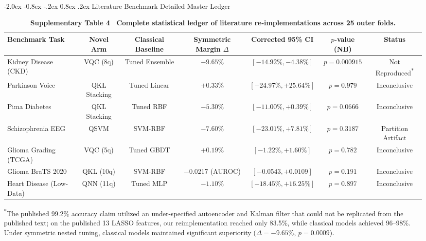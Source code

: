 \documentclass[10pt,a4paper]{article}
\makeatletter
\renewcommand{\subsection}{\@startsection{subsection}{2}{\z@}%
  {-2.0ex \@plus -0.8ex \@minus -.2ex}%
  {0.8ex \@plus.2ex}%
  {\normalfont\large\sffamily\bfseries\color{naturedark}}}
\makeatother
\begin{document}
\subsection{Literature Benchmark Detailed Master Ledger}
\begin{table}[h]
\centering
\scriptsize
\caption*{\textbf{\textsf{Supplementary Table 4 \textbar\ Complete statistical ledger of literature re-implementations across 25 outer folds.}}}
\begin{tabular}{lcccccc}
\toprule
\textbf{Benchmark Task} & \textbf{Novel Arm} & \textbf{Classical Baseline} & \textbf{Symmetric Margin $\Delta$} & \textbf{Corrected 95\% CI} & \textbf{$p$-value (NB)} & \textbf{Status} \\
\midrule
Kidney Disease (CKD) & VQC (8q) & Tuned Ensemble & $-9.65\%$ & $[-14.92\%, -4.38\%]$ & $p = 0.000915$ & Not Reproduced\textsuperscript{*} \\
Parkinson Voice & QKL Stacking & Tuned Linear & $+0.33\%$ & $[-24.97\%, +25.64\%]$ & $p = 0.979$ & Inconclusive \\
Pima Diabetes & QKL Stacking & Tuned RBF & $-5.30\%$ & $[-11.00\%, +0.39\%]$ & $p = 0.0666$ & Inconclusive \\
Schizophrenia EEG & QSVM & SVM-RBF & $-7.60\%$ & $[-23.01\%, +7.81\%]$ & $p = 0.3187$ & Partition Artifact \\
Glioma Grading (TCGA) & VQC (5q) & Tuned GBDT & $+0.19\%$ & $[-1.22\%, +1.60\%]$ & $p = 0.782$ & Inconclusive \\
Glioma BraTS 2020 & QKL (10q) & SVM-RBF & $-0.0217$ (AUROC) & $[-0.0543, +0.0109]$ & $p = 0.191$ & Inconclusive \\
Heart Disease (Low-Data) & QNN (11q) & Tuned MLP & $-1.10\%$ & $[-18.45\%, +16.25\%]$ & $p = 0.897$ & Inconclusive \\
\bottomrule
\end{tabular}
\vspace{2pt}
\begin{flushleft}
\scriptsize\textsuperscript{*}The published 99.2\% accuracy claim utilized an under-specified autoencoder and Kalman filter that could not be replicated from the published text; on the published 13 LASSO features, our reimplementation reached only 83.5\%, while classical models achieved 96--98\%. Under symmetric nested tuning, classical models maintained significant superiority ($\Delta = -9.65\%$, $p = 0.0009$).
\end{flushleft}
\end{table}
\end{document}
